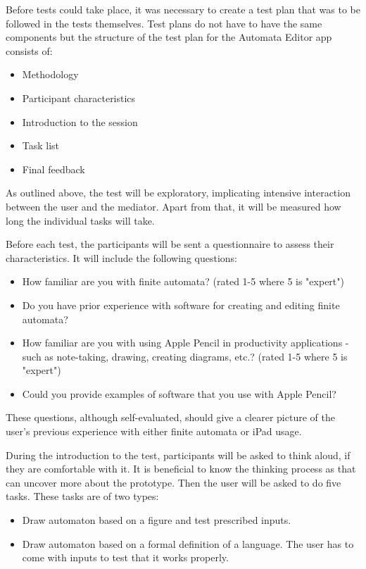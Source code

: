 Before tests could take place, it was necessary to create a test plan that was to be followed in the tests themselves. Test plans do not have to have the same components but the structure of the test plan for the Automata Editor app consists of:
\begin{itemize}
    \item Methodology
    \item Participant characteristics
    \item Introduction to the session
    \item Task list
    \item Final feedback
\end{itemize}

As outlined above, the test will be exploratory, implicating intensive interaction between the user and the mediator. Apart from that, it will be measured how long the individual tasks will take.

Before each test, the participants will be sent a questionnaire to assess their characteristics. It will include the following questions:
\begin{itemize}
    \item How familiar are you with finite automata? (rated 1-5 where 5 is "expert")
    \item Do you have prior experience with software for creating and editing finite automata?
    \item How familiar are you with using Apple Pencil in productivity applications - such as note-taking, drawing, creating diagrams, etc.? (rated 1-5 where 5 is "expert")
    \item Could you provide examples of software that you use with Apple Pencil?
\end{itemize}
These questions, although self-evaluated, should give a clearer picture of the user's previous experience with either finite automata or iPad usage.

During the introduction to the test, participants will be asked to think aloud, if they are comfortable with it. It is beneficial to know the thinking process as that can uncover more about the prototype. Then the user will be asked to do five tasks. These tasks are of two types:
\begin{itemize}
    \item Draw automaton based on a figure and test prescribed inputs.
    \item Draw automaton based on a formal definition of a language. The user has to come with inputs to test that it works properly.
\end{itemize}

